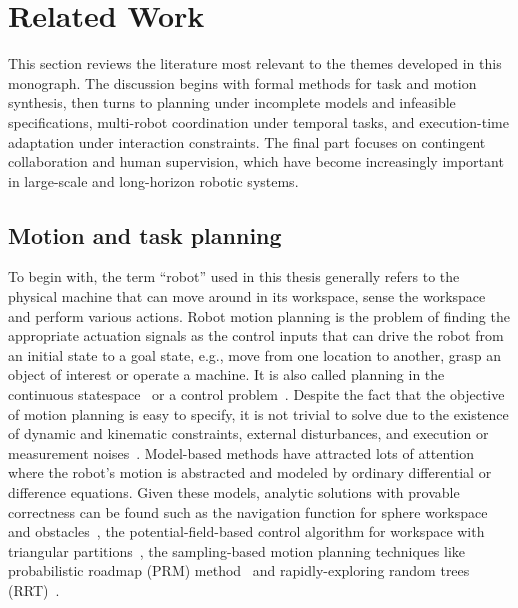 \section{Related Work}
\label{ch01:sec:related_work}

This section reviews the literature most relevant to the themes developed in this
monograph. The discussion begins with formal methods for task and motion
synthesis, then turns to planning under incomplete models and infeasible
specifications, multi-robot coordination under temporal tasks, and execution-time
adaptation under interaction constraints. The final part focuses on contingent
collaboration and human supervision, which have become increasingly important in
large-scale and long-horizon robotic systems.


\subsection{Motion and task planning}\label{sec:robot-motion}

To begin with, the term ``robot'' used in this thesis generally refers to the physical machine that can move around in its workspace, sense the workspace and perform various actions.
Robot motion planning is the problem of finding the appropriate actuation signals as the control inputs that can drive the robot from an initial state to a goal state, e.g., move from one location to another, grasp an object of interest or operate a machine.
It is also called {planning in the continuous statespace}~\cite{lavalle2006planning} or a control problem~\cite{doyle1992feedback}.
Despite the fact that the objective of motion planning is  easy to specify, it is not trivial to solve due to the existence of dynamic and kinematic constraints, external disturbances, and execution or measurement noises~\cite{latombe2012robot}.
Model-based methods have attracted lots of attention where the robot's motion is abstracted and modeled by ordinary differential or difference equations. Given these models, analytic solutions with provable correctness can be found such as the navigation function  for sphere workspace and obstacles~\cite{koditschek1990robot}, the potential-field-based control algorithm for workspace with triangular partitions~\cite{lindemann2006real}, the sampling-based motion planning techniques like probabilistic roadmap (PRM) method~\cite{kavraki1996probabilistic} and rapidly-exploring random trees (RRT)~\cite{lavalle1998rapidly, lavalle2000rapidly, karaman2011sampling}.


